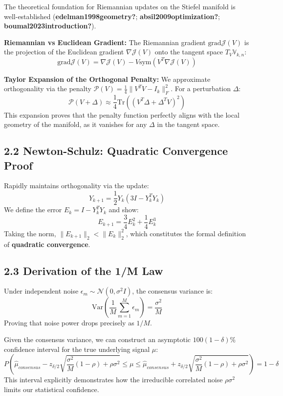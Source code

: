 \documentclass[
  letterpaper,
]{report}
\begin{document}
The theoretical foundation for Riemannian updates on the Stiefel
manifold is well-established (\textbf{edelman1998geometry?};
\textbf{absil2009optimization?}; \textbf{boumal2023introduction?}).

\textbf{Riemannian vs Euclidean Gradient:} The Riemannian gradient
\(\text{grad} \mathcal{J}(V)\) is the projection of the Euclidean
gradient \(\nabla \mathcal{J}(V)\) onto the tangent space
\(T_V \mathbb{V}_{k,n}\):
\[ \text{grad} \mathcal{J}(V) = \nabla \mathcal{J}(V) - V \text{sym}(V^T \nabla \mathcal{J}(V)) \]

\textbf{Taylor Expansion of the Orthogonal Penalty:} We approximate
orthogonality via the penalty
\(\mathcal{P}(V) = \frac{1}{4} \| V^T V - I_k \|_F^2\). For a
perturbation \(\Delta\):
\[ \mathcal{P}(V + \Delta) \approx \frac{1}{4} \text{Tr}\left( (V^T \Delta + \Delta^T V)^2 \right) \]
This expansion proves that the penalty function perfectly aligns with
the local geometry of the manifold, as it vanishes for any \(\Delta\) in
the tangent space.

\subsection{2.2 Newton-Schulz: Quadratic Convergence
Proof}\label{newton-schulz-quadratic-convergence-proof}

Rapidly maintains orthogonality via the update:
\[ Y_{k+1} = \frac{1}{2} Y_k (3I - Y_k^T Y_k) \] We define the error
\(E_k = I - Y_k^T Y_k\) and show:
\[ E_{k+1} = \frac{3}{4} E_k^2 + \frac{1}{4} E_k^3 \] Taking the norm,
\(\| E_{k+1} \|_2 < \| E_k \|_2^2\), which constitutes the formal
definition of \textbf{quadratic convergence}.

\subsection{2.3 Derivation of the 1/M
Law}\label{derivation-of-the-1m-law}

Under independent noise \(\epsilon_m \sim \mathcal{N}(0, \sigma^2 I)\),
the consensus variance is:
\[ \text{Var}\left( \frac{1}{M} \sum_{m=1}^M \epsilon_m \right) = \frac{\sigma^2}{M} \]
Proving that noise power drops precisely as \(1/M\).

Given the consensus variance, we can construct an asymptotic
\(100(1-\delta)\%\) confidence interval for the true underlying signal
\(\mu\):
\[ P\left( \hat{\mu}_{consensus} - z_{\delta/2} \sqrt{\frac{\sigma^2}{M}(1-\rho) + \rho\sigma^2} \leq \mu \leq \hat{\mu}_{consensus} + z_{\delta/2} \sqrt{\frac{\sigma^2}{M}(1-\rho) + \rho\sigma^2} \right) = 1 - \delta \]
This interval explicitly demonstrates how the irreducible correlated
noise \(\rho\sigma^2\) limits our statistical confidence.
\end{document}
